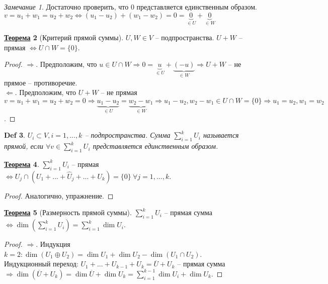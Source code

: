 \documentclass[12pt]{article}
\def\SO{\Rightarrow}     %
\def\EQ{\Leftrightarrow} %
\theoremstyle{definition} %
\newtheorem{Thm}{\underline{Теорема}}[subsection] %
\theoremstyle{plain} %
\newtheorem{Def}[Thm]{Def} %
\theoremstyle{remark} %
\newtheorem{Rem}[Thm]{Замечание} %
\begin{document}
{\begin{Rem}
    Достаточно проверить, что 0 представляется единственным образом.
    $v = u_1 + w_1 = u_2 + w_2 \EQ (u_1 - u_2) + (w_1 - w_2) = 0 = \underbrace{0}_{\in U} + \underbrace{0}_{\in W}$ 
\end{Rem}

\begin{Thm}[Критерий прямой суммы]
    $U, W \in V$ -- подпространства. $U + W$ -- прямая $\EQ U \cap W = \{0\}$.
\end{Thm}

\begin{proof}
    $\SO$. Предположим, что $u \in U \cap W \SO 0 = \underbrace{u}_{\in U} + \underbrace{(-u)}_{\in W} \SO U + W$ -- не прямое -- противоречие. \\
    $\Leftarrow$. Предположим, что $U + W$ -- не прямая $v = u_1 + w_1 = u_2 + w_2 = 0 \SO \underbrace{u_1 - u_2}_{\in U} = \underbrace{w_2 - w_1}_{\in W} \SO u_1 - u_2, w_2 - w_1 \in U \cap W = \{0\} \SO u_1 = u_2, w_1 = w_2$.  
\end{proof}

\begin{Def}
    $U_i \subset V, i = 1, ..., k$ -- подпространства. Сумма $\sum_{i = 1}^k U_i$ называется прямой, если 
    $\forall v \in \sum_{i = 1}^k U_i$ представляется единственным образом.
\end{Def}

\begin{Thm}
    $\sum_{i = 1}^k U_i$ -- прямая $\EQ U_j \cap (U_1 + ... + \widehat{U}_j + ... + U_k) = \{0\} \ \forall j = 1, ..., k$. 
\end{Thm}

\begin{proof}
    Аналогично, упражнение.
\end{proof}

\begin{Thm}[Размерность прямой суммы]
    $\sum_{i = 1}^k U_i$ -- прямая сумма $\EQ \dim \left(\sum_{i = 1}^k U_i\right) = \sum_{i = 1}^k \dim U_i$. 
\end{Thm}

\begin{proof}
    $\SO$. Индукция $k = 2 : \dim(U_1 \oplus U_2) = \dim U_1 + \dim U_2 - \dim(U_1 \cap U_2)$. \\
    Индукционный переход: $U_1 + ... + U_{k - 1} + U_k = \overline{U} + U_k$ -- прямая сумма
    $\SO \dim(\overline{U} + U_k) = \dim \overline{U} + \dim U_k = \sum_{i = 1}^{k - 1} \dim U_i + \dim U_k$.


\end{proof}}
\end{document}
